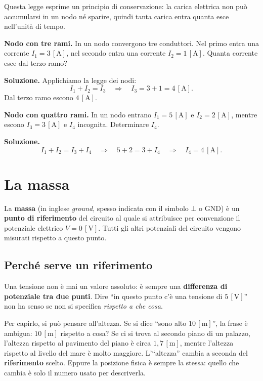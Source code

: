 Questa legge esprime un principio di conservazione: la carica elettrica non può accumularsi in un nodo né sparire, quindi tanta carica entra quanta esce nell'unità di tempo.

\begin{esempio}
\textbf{Nodo con tre rami.} In un nodo convergono tre conduttori. Nel primo entra una corrente \(I_1 = 3\,[\text{A}]\), nel secondo entra una corrente \(I_2 = 1\,[\text{A}]\). Quanta corrente esce dal terzo ramo?

\smallskip
\textbf{Soluzione.} Applichiamo la legge dei nodi:
\[
I_1 + I_2 = I_3 \quad \Longrightarrow \quad I_3 = 3 + 1 = 4\,[\text{A}].
\]
Dal terzo ramo escono \(4\,[\text{A}]\).
\end{esempio}

\begin{esempio}
\textbf{Nodo con quattro rami.} In un nodo entrano \(I_1 = 5\,[\text{A}]\) e \(I_2 = 2\,[\text{A}]\), mentre escono \(I_3 = 3\,[\text{A}]\) e \(I_4\) incognita. Determinare \(I_4\).

\smallskip
\textbf{Soluzione.}
\[
I_1 + I_2 = I_3 + I_4 \quad \Longrightarrow \quad 5 + 2 = 3 + I_4 \quad \Longrightarrow \quad I_4 = 4\,[\text{A}].
\]
\end{esempio}

\section{La massa}

\begin{concetto}
La \textbf{massa} (in inglese \textit{ground}, spesso indicata con il simbolo \(\bot\) o GND) è un \textbf{punto di riferimento} del circuito al quale si attribuisce per convenzione il potenziale elettrico \(V = 0\,[\text{V}]\). Tutti gli altri potenziali del circuito vengono misurati rispetto a questo punto.
\end{concetto}

\subsection{Perché serve un riferimento}

Una tensione non è mai un valore assoluto: è sempre una \textbf{differenza di potenziale tra due punti}. Dire ``in questo punto c'è una tensione di \(5\,[\text{V}]\)'' non ha senso se non si specifica \emph{rispetto a che cosa}.

Per capirlo, si può pensare all'altezza. Se si dice ``sono alto \(10\,[\text{m}]\)'', la frase è ambigua: \(10\,[\text{m}]\) rispetto a cosa? Se ci si trova al secondo piano di un palazzo, l'altezza rispetto al pavimento del piano è circa \(1{,}7\,[\text{m}]\), mentre l'altezza rispetto al livello del mare è molto maggiore. L'``altezza'' cambia a seconda del \textbf{riferimento} scelto. Eppure la posizione fisica è sempre la stessa: quello che cambia è solo il numero usato per descriverla.


